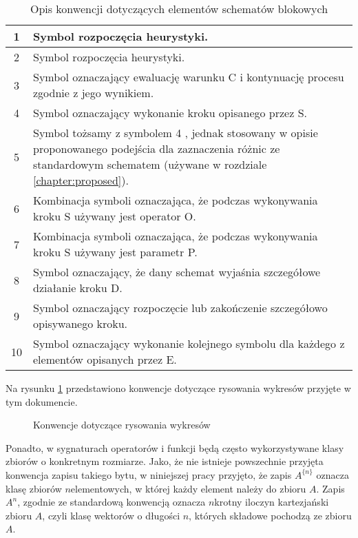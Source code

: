 \documentclass[twoside]{iisthesis}
\newcommand{\withSize}[2]{{#1}^{ \{ #2 \}}}
\newcommand{\circled}[1]{ \textcircled{\scriptsize{#1}} }
\newcommand{\graph}[1]{}
\begin{document}
\begin{table}
	\caption{Opis konwencji dotyczących elementów schematów blokowych \label{table:flowchart_conventions}}
	\begin{tabularx}{\linewidth}{|c|X|}
		\hline 
		\circled{1} & Symbol rozpoczęcia heurystyki. \\
		\hline
		\circled{2} & Symbol rozpoczęcia heurystyki. \\
		\hline
		\circled{3} & Symbol oznaczający ewaluację warunku C i kontynuację procesu zgodnie z jego wynikiem. \\
		\hline
		\circled{4} & Symbol oznaczający wykonanie kroku opisanego przez S. \\
		\hline
		\circled{5} & Symbol tożsamy z symbolem \circled{4}, jednak stosowany w opisie proponowanego podejścia dla zaznaczenia różnic ze standardowym schematem (używane w rozdziale \ref{chapter:proposed}).\\
		\hline
		\circled{6} & Kombinacja symboli oznaczająca, że podczas wykonywania kroku S używany jest operator O. \\
		\hline
		\circled{7} & Kombinacja symboli oznaczająca, że podczas wykonywania kroku S używany jest parametr P. \\
		\hline
		\circled{8} & Symbol oznaczający, że dany schemat wyjaśnia szczegółowe działanie kroku D. \\
		\hline
		\circled{9} & Symbol oznaczający rozpoczęcie lub zakończenie szczegółowo opisywanego kroku. \\
		\hline
		\circled{10} & Symbol oznaczający wykonanie kolejnego symbolu dla każdego z elementów opisanych przez E. \\
		\hline
	\end{tabularx}
\end{table}

Na rysunku \ref{plot:conventions} przedstawiono konwencje dotyczące rysowania wykresów przyjęte w tym dokumencie.

\begin{figure}
	\caption{Konwencje dotyczące rysowania wykresów \label{plot:conventions}}
	\centering
	\graph{example_whiskers.tex}
\end{figure}

Ponadto, w sygnaturach operatorów i funkcji będą często wykorzystywane klasy zbiorów o konkretnym rozmiarze. Jako, że nie istnieje powszechnie przyjęta konwencja zapisu takiego bytu, w niniejszej pracy przyjęto, że zapis $\withSize{A}{n}$ oznacza klasę zbiorów $n$elementowych, w której każdy element należy do zbioru $A$. Zapis $A^n$, zgodnie ze standardową konwencją oznacza $n$krotny iloczyn kartezjański zbioru $A$, czyli klasę wektorów o długości $n$, których składowe pochodzą ze zbioru $A$.
\end{document}
